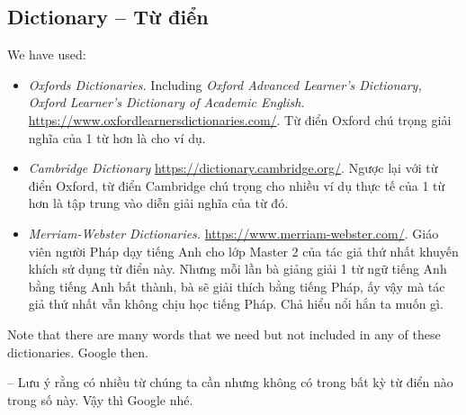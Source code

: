 \documentclass[12pt,oneside]{book}
\begin{document}
\subsection{Dictionary -- Từ điển}
We have used:
\begin{itemize}
	\item {\it Oxfords Dictionaries.} Including {\it Oxford Advanced Learner's Dictionary, Oxford Learner's Dictionary of Academic English}. \url{https://www.oxfordlearnersdictionaries.com/}. Từ điển Oxford chú trọng giải nghĩa của 1 từ hơn là cho ví dụ.
	\item {\it Cambridge Dictionary} \url{https://dictionary.cambridge.org/}. Ngược lại với từ điển Oxford, từ điển Cambridge chú trọng cho nhiều ví dụ thực tế của 1 từ hơn là tập trung vào diễn giải nghĩa của từ đó.
	\item {\it Merriam-Webster Dictionaries.} \url{https://www.merriam-webster.com/}. Giáo viên người Pháp dạy tiếng Anh cho lớp Master 2 của tác giả thứ nhất khuyến khích sử dụng từ điển này. Nhưng mỗi lần bà giảng giải 1 từ ngữ tiếng Anh bằng tiếng Anh bất thành, bà sẽ giải thích bằng tiếng Pháp, ấy vậy mà tác giả thứ nhất vẫn không chịu học tiếng Pháp. Chả hiểu nổi hắn ta muốn gì.
\end{itemize}
Note that there are many words that we need but not included in any of these dictionaries. Google then.

-- Lưu ý rằng có nhiều từ chúng ta cần nhưng không có trong bất kỳ từ điển nào trong số này. Vậy thì Google nhé.
\end{document}
